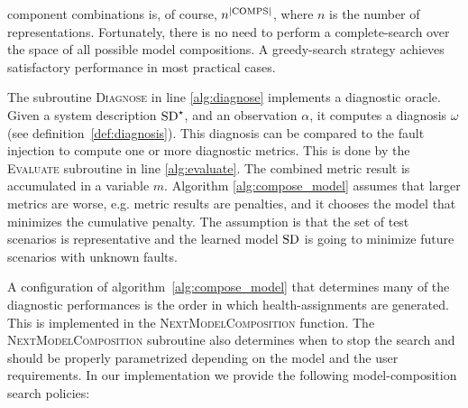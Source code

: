 component combinations is, of course, $n^{|\mathrm{COMPS}|}$, where $n$ is the
number of representations. Fortunately, there is no need to perform a
complete-search over the space of all possible model compositions. A
greedy-search strategy achieves satisfactory performance in most
practical cases.
\par
The subroutine \textsc{Diagnose} in line \ref{alg:diagnose} implements
a diagnostic oracle. Given a system description $\mathrm{SD}^\star$, and an
observation $\alpha$, it computes a diagnosis $\omega$ (see
definition~\ref{def:diagnosis}). This diagnosis can be compared to the
fault injection to compute one or more diagnostic metrics. This is
done by the \textsc{Evaluate} subroutine in line
\ref{alg:evaluate}. The combined metric result is accumulated in a variable
$m$. Algorithm \ref{alg:compose_model} assumes that larger metrics are
worse, e.g. metric results are penalties, and it chooses the model
that minimizes the cumulative penalty. The assumption is that the set
of test scenarios is representative and the learned model $\mathrm{SD}$ is
going to minimize future scenarios with unknown faults.
\par
A configuration of algorithm~\ref{alg:compose_model} that determines
many of the diagnostic performances is the order in which
health-assignments are generated. This is implemented in the
\textsc{NextModelComposition} function. The
\textsc{NextModelComposition} subroutine also determines when to stop
the search and should be properly parametrized depending on the model
and the user requirements. In our implementation we provide the
following model-composition search policies:
%
